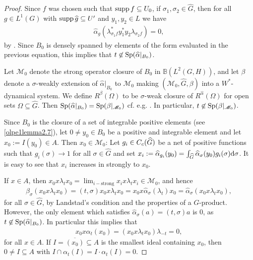 \begin{proof}
Since $f$ was chosen such that $ \operatorname{supp} f \subseteq U_0$, if $\sigma_1,\sigma_2  \in \hat G$, then for all $g \in L^1(G)$ with $\operatorname{supp} \widehat{g} \subseteq U'$ and $y_1,y_2 \in L$ we have
\begin{align*}
	\hat \alpha_g(\lambda_{\sigma_1 f}^* y_1^* y_2 \lambda_{\sigma_2 f}) = 0,
\end{align*}
by . Since $B_0$ is densely spanned by elements of the form evaluated in the previous equation, this implies that $t \not\in \mathrm{Sp}(\widehat{\alpha}|_{B_0})$.

Let $\mathscr{M}_0$ denote the strong operator closure of $B_0$ in $\mathbb{B}(L^2(G,H))$, and let $\beta$ denote a $\sigma$-weakly extension of $\hat \alpha|_{B_0}$ to $\mathscr{M}_0$ making $(\mathscr{M}_0, \hat G, \beta)$ into a $W^*$-dynamical system. We define $R^{\beta}(\Omega)$ to be $\sigma$-weak closure of $R^{\hat \alpha}(\Omega)$ for open sets $\Omega \subseteq \hat G$. Then $\mathrm{Sp}(\widehat{\alpha}|_{B_0})= \mathrm{Sp}(\beta|_{\mathscr{M}_0})$ cf. e.g. \cite[Proposition 8.8.9]{pedersenalgauto}. In particular, $t \not \in \mathrm{Sp}(\beta|_{\mathscr{M}_0})$.

Since $B_0$ is the closure of a set of integrable positive elements (see \cref{olpe1lemma2.7}), let $0 \neq y_0 \in B_0$ be a positive and integrable element and let $x_0 := I(y_0) \in A$. Then $x_0 \in \mathscr{M}_0$: Let $g_i \in C_c(\widehat{G})$ be a net of positive functions such that $g_i(\sigma)\to 1$ for all $\sigma \in \hat G$ and set $x_i := \widehat{\alpha}_{g_i}(y_0) = \int_{\widehat{G}} \widehat{\alpha}_{\sigma}(y_0) g_i(\sigma) \mathrm{d} \sigma $. It is easy to see that $x_i$ increases in strongly to $x_0$.

If $x \in A$, then $x_0 x \lambda_t x_0 = \lim_{i-\text{strong}} x_i x \lambda_t x_i \in \mathscr{M}_0$, and hence
\begin{align*}
	\beta_{\sigma}(x_0 x \lambda_t x_0) =(t,\sigma) x_0 x \lambda_t x_0= x_0 x \hat \alpha_\sigma(\lambda_t) x_0 =   \hat \alpha_\sigma( x_0 x \lambda_t x_0)  ,
\end{align*}
for all $\sigma \in \hat G$, by Landstad's condition and the properties of a $G$-product. However, the only element which satisfies $\hat \alpha_\sigma (a)=(t,\sigma) a$ is $0$, as $t \not \in \mathrm{Sp}(\widehat{\alpha} |_{B_0})$. In particular this implies that
\begin{align*}
	x_0 x \alpha_t(x_0) = (x_0 x \lambda_t x_0) \lambda_{-t} = 0,
\end{align*}
for all $x \in A$. If $I = \overline{(x_0)} \subseteq A$ is the smallest ideal containing $x_0$, then $0 \neq I \subseteq A$ with $I \cap \alpha_t(I)=I\cdot\alpha_t(I)=0$.
\end{proof}
